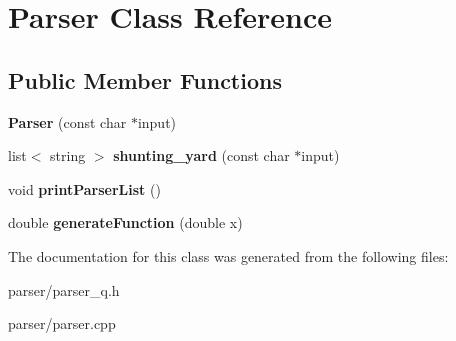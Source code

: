 \hypertarget{class_parser}{}\section{Parser Class Reference}
\label{class_parser}
\subsection*{Public Member Functions}
\begin{DoxyCompactItemize}
\item 
\hypertarget{class_parser_a40600baa2c3d4262fd8b770a4615aed0}{}\label{class_parser_a40600baa2c3d4262fd8b770a4615aed0} 
{\bfseries Parser} (const char $\ast$input)
\item 
\hypertarget{class_parser_a7003f1e13cb376b174d7d720dedc09c1}{}\label{class_parser_a7003f1e13cb376b174d7d720dedc09c1} 
list$<$ string $>$ {\bfseries shunting\+\_\+yard} (const char $\ast$input)
\item 
\hypertarget{class_parser_a8170d5366fbb13b3ff927ddb218ce64f}{}\label{class_parser_a8170d5366fbb13b3ff927ddb218ce64f} 
void {\bfseries print\+Parser\+List} ()
\item 
\hypertarget{class_parser_a87379572381caac58f729090422374bb}{}\label{class_parser_a87379572381caac58f729090422374bb} 
double {\bfseries generate\+Function} (double x)
\end{DoxyCompactItemize}


The documentation for this class was generated from the following files\+:\begin{DoxyCompactItemize}
\item 
parser/parser\+\_\+q.\+h\item 
parser/parser.\+cpp\end{DoxyCompactItemize}
